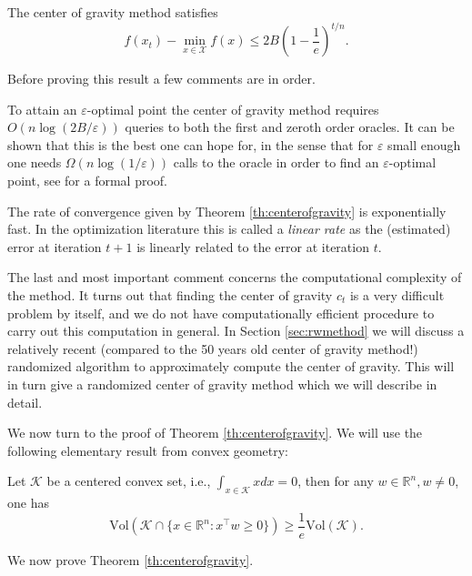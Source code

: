 \documentclass[openany]{now}
\newcommand{\R}{\mathbb{R}}
\newcommand{\cK}{\mathcal{K}}
\renewcommand{\epsilon}{\varepsilon}
\begin{document}
\begin{theorem}
\label{th:centerofgravity}
The center of gravity method satisfies
$$f(x_t) - \min_{x \in \mathcal{X}} f(x) \leq 2 B \left(1 - \frac1{e} \right)^{t/n} .$$
\end{theorem}
Before proving this result a few comments are in order. 

To attain an $\epsilon$-optimal point the center of gravity method requires $O( n \log (2 B / \epsilon))$ queries to both the first and zeroth order oracles. It can be shown that this is the best one can hope for, in the sense that for $\epsilon$ small enough one needs $\Omega(n \log(1/ \epsilon))$ calls to the oracle in order to find an $\epsilon$-optimal point, see \cite{NY83} for a formal proof.

The rate of convergence given by Theorem \ref{th:centerofgravity} is exponentially fast. In the optimization literature this is called a {\em linear rate} as the (estimated) error at iteration $t+1$ is linearly related to the error at iteration $t$.


The last and most important comment concerns the computational complexity of the method. It turns out that finding the center of gravity $c_t$ is a very difficult problem by itself, and we do not have computationally efficient procedure to carry out this computation in general. In Section \ref{sec:rwmethod} we will discuss a relatively recent (compared to the 50 years old center of gravity method!) randomized algorithm to approximately compute the center of gravity. This will in turn give a randomized center of gravity method which we will describe in detail.

We now turn to the proof of Theorem \ref{th:centerofgravity}. We will use the following elementary result from convex geometry:


\begin{lemma} \label{lem:Gru60}
Let $\cK$ be a centered convex set, i.e., $\int_{x \in \cK} x dx = 0$, then for any $w \in \R^n, w \neq 0$, one has
$$\mathrm{Vol} \left( \cK \cap \{x \in \R^n : x^{\top} w \geq 0\} \right) \geq \frac{1}{e} \mathrm{Vol} (\cK) .$$
\end{lemma}
We now prove Theorem \ref{th:centerofgravity}.
\end{document}
